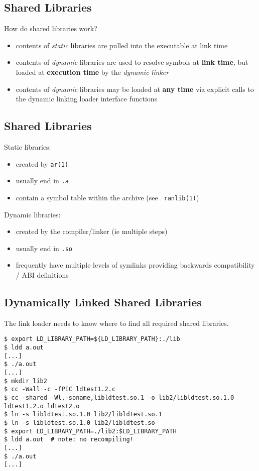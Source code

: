 \documentclass[xga]{xdvislides}
\begin{document}
\subsection{Shared Libraries}
How do shared libraries work?
\begin{itemize}
	\item contents of {\em static} libraries are pulled into the
		executable at link time
	\item contents of {\em dynamic} libraries are used to resolve
		symbols at {\bf link time}, but loaded at {\bf execution time} by the
		{\em dynamic linker}
	\item contents of {\em dynamic} libraries may be loaded at {\bf any
		time} via explicit calls to the dynamic linking loader interface
		functions
\end{itemize}

\subsection{Shared Libraries}
Static libraries:
\begin{itemize}
	\item created by {\tt ar(1)}
	\item usually end in {\tt .a}
	\item contain a symbol table within the archive (see {\tt
		ranlib(1)})
\end{itemize}

Dynamic libraries:
\begin{itemize}
	\item created by the compiler/linker (ie multiple steps)
	\item usually end in {\tt .so}
	\item frequently have multiple levels of symlinks providing
		backwards compatibility / ABI definitions
\end{itemize}

\subsection{Dynamically Linked Shared Libraries}
The link loader needs to know where to find all required shared libraries.
\begin{verbatim}
$ export LD_LIBRARY_PATH=${LD_LIBRARY_PATH}:./lib
$ ldd a.out
[...]
$ ./a.out
[...]
$ mkdir lib2
$ cc -Wall -c -fPIC ldtest1.2.c
$ cc -shared -Wl,-soname,libldtest.so.1 -o lib2/libldtest.so.1.0 ldtest1.2.o ldtest2.o
$ ln -s libldtest.so.1.0 lib2/libldtest.so.1
$ ln -s libldtest.so.1.0 lib2/libldtest.so
$ export LD_LIBRARY_PATH=./lib2:$LD_LIBRARY_PATH
$ ldd a.out  # note: no recompiling!
[...]
$ ./a.out
[...]
\end{verbatim}
\end{document}
